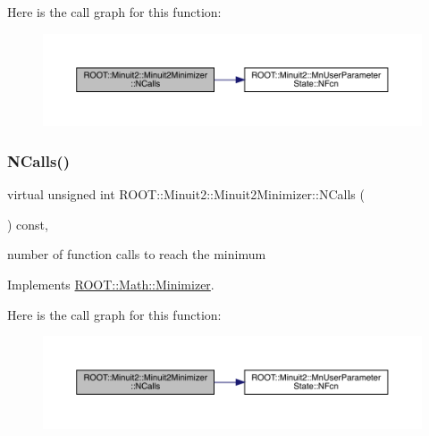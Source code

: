 Here is the call graph for this function\+:
\nopagebreak
\begin{figure}[H]
\begin{center}
\leavevmode
\includegraphics[width=350pt]{d0/d9c/classROOT_1_1Minuit2_1_1Minuit2Minimizer_ab5faf7c3dc0b3743eee8352c62a6ccfd_cgraph}
\end{center}
\end{figure}
\mbox{\label{classROOT_1_1Minuit2_1_1Minuit2Minimizer_ab5faf7c3dc0b3743eee8352c62a6ccfd}} 
\subsubsection{\texorpdfstring{NCalls()}{NCalls()}\hspace{0.1cm}{\footnotesize\ttfamily [2/2]}}
{\footnotesize\ttfamily virtual unsigned int R\+O\+O\+T\+::\+Minuit2\+::\+Minuit2\+Minimizer\+::\+N\+Calls (\begin{DoxyParamCaption}{ }\end{DoxyParamCaption}) const\hspace{0.3cm}{\ttfamily [inline]}, {\ttfamily [virtual]}}



number of function calls to reach the minimum 



Implements \mbox{\hyperlink{classROOT_1_1Math_1_1Minimizer_abf8b2e97d47843a1fde7a54cb51c1f0e}{R\+O\+O\+T\+::\+Math\+::\+Minimizer}}.

Here is the call graph for this function\+:
\nopagebreak
\begin{figure}[H]
\begin{center}
\leavevmode
\includegraphics[width=350pt]{d0/d9c/classROOT_1_1Minuit2_1_1Minuit2Minimizer_ab5faf7c3dc0b3743eee8352c62a6ccfd_cgraph}
\end{center}
\end{figure}
\mbox{\label{classROOT_1_1Minuit2_1_1Minuit2Minimizer_a6ed2c7d99296e222f0f43295e302eb9e}} 

